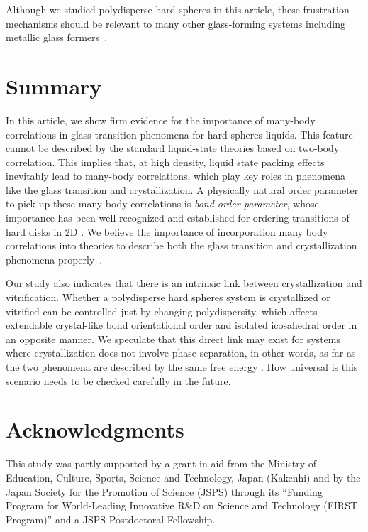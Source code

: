 \documentclass[twocolumn,superscriptaddress]{revtex4}
\begin{document}
Although we studied polydisperse hard spheres in this article, these frustration mechanisms should be relevant to many other 
glass-forming systems including metallic glass formers~\cite{Jakse2008,Hwang2012}. 

\section{Summary}


In this article, we show firm evidence for the importance of many-body correlations in glass transition phenomena 
for hard spheres liquids. This feature cannot be described by the standard liquid-state theories based on two-body correlation. 
This implies that, at high density, liquid state packing effects inevitably lead to many-body correlations, which play 
key roles in phenomena like the glass transition and crystallization. 
A physically natural order parameter to pick up these many-body correlations is \emph{bond order parameter}, whose importance 
has been well recognized and established for ordering transitions of hard disks in 2D \cite{NelsonB}. 
We believe the importance of incorporation many body correlations into theories to describe
both the glass transition and crystallization phenomena properly~\cite{TanakaJSP,TanakaR}.

Our study also indicates that there is an intrinsic link between crystallization and vitrification. 
Whether a polydisperse hard spheres system is crystallized or vitrified can be controlled just by changing 
polydispersity, which affects extendable crystal-like bond orientational order and isolated icosahedral order 
in an opposite manner.
We speculate that this direct link may exist for systems where crystallization does not involve phase separation, 
in other words, as far as the two phenomena are described by the same free energy \cite{TanakaGJPCM,TanakaJSP,TanakaR}.  
How universal is this scenario needs to be checked carefully in the future. 

\section*{Acknowledgments}
This study was partly supported by a grant-in-aid from 
the Ministry of Education, Culture, Sports, Science and Technology, Japan (Kakenhi)
and by the Japan Society for the Promotion of
Science (JSPS) through its ``Funding Program for World-Leading
Innovative R\&D on Science and Technology (FIRST Program)'' and a JSPS Postdoctoral Fellowship.






\end{document}

